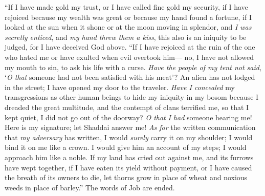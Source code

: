 \begin{biblechapter}
\verse “If I have made gold my trust, 
or I have called fine gold my security,
\verse if I have rejoiced because my wealth was great 
or because my hand found a fortune,
\verse if I looked at the sun when it shone 
or at the moon moving in splendor,
\verse and \textit{I was secretly enticed}, 
and \textit{my hand threw them a kiss},
\verse this also is an iniquity to be judged, 
for I have deceived God above.
\verse “If I have rejoiced at the ruin of the one who hated me 
or have exulted when evil overtook him—
\verse no, I have not allowed my mouth to sin, 
to ask his life with a curse.
\verse \textit{Have the people of my tent not said}, 
‘\textit{O that} someone had not been satisfied with his meat’?
\verse An alien has not lodged in the street; 
I have opened my door to the traveler.
\verse \textit{Have I concealed} my transgressions as other human beings 
to hide my iniquity in my bosom
\verse because I dreaded the great multitude, 
and the contempt of clans terrified me, 
so that I kept quiet, I did not go out of the doorway?
\verse \textit{O that} \textit{I had} someone hearing me! 
Here is my signature; 
let Shaddai answer me! 
\textit{As for} the written communication that \textit{my adversary} has written,
\verse I would \textit{surely} carry it on my shoulder; 
I would bind it on me like a crown.
\verse I would give him an account of my steps; 
I would approach him like a noble.
\verse If my land has cried out against me, 
and its furrows have wept together,
\verse if I have eaten its yield without payment, 
or I have caused the breath of its owners to die,
\verse let thorns grow in place of wheat 
and noxious weeds in place of barley.” 
The words of Job are ended.
\end{biblechapter}

